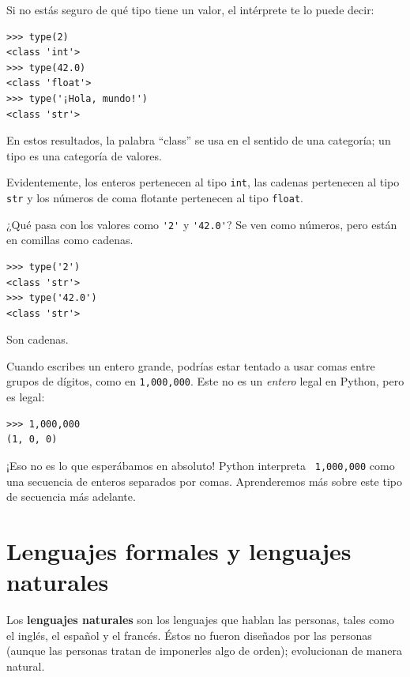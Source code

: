 \documentclass[10pt]{book}
\begin{document}
Si no estás seguro de qué tipo tiene un valor, el intérprete te lo
puede decir:

\begin{verbatim}
>>> type(2)
<class 'int'>
>>> type(42.0)
<class 'float'>
>>> type('¡Hola, mundo!')
<class 'str'>
\end{verbatim}
%
En estos resultados, la palabra ``class'' se usa en el sentido de
una categoría; un tipo es una categoría de valores.

Evidentemente, los enteros pertenecen al tipo {\tt int},
las cadenas pertenecen al tipo {\tt str} y los números de
coma flotante pertenecen al tipo {\tt float}.

¿Qué pasa con los valores como \verb"'2'" y \verb"'42.0'"?
Se ven como números, pero están en comillas como
cadenas.

\begin{verbatim}
>>> type('2')
<class 'str'>
>>> type('42.0')
<class 'str'>
\end{verbatim}
%
Son cadenas.

Cuando escribes un entero grande, podrías estar tentado a usar comas
entre grupos de dígitos, como en {\tt 1,000,000}.  Este no es un
{\em entero} legal en Python, pero es legal:

\begin{verbatim}
>>> 1,000,000
(1, 0, 0)
\end{verbatim}
%
¡Eso no es lo que esperábamos en absoluto!  Python interpreta {\tt
  1,000,000} como una secuencia de enteros separados por comas.  Aprenderemos
más sobre este tipo de secuencia más adelante.




\section{Lenguajes formales y lenguajes naturales}

Los {\bf lenguajes naturales} son los lenguajes que hablan las personas,
tales como el inglés, el español y el francés.  Éstos no fueron diseñados
por las personas (aunque las personas tratan de imponerles algo de orden);
evolucionan de manera natural.
\end{document}
